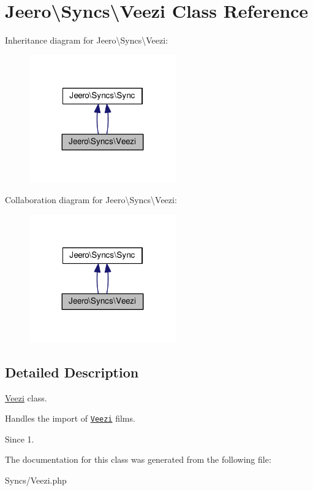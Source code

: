 \hypertarget{classJeero_1_1Syncs_1_1Veezi}{}\section{Jeero\textbackslash{}Syncs\textbackslash{}Veezi Class Reference}
\label{classJeero_1_1Syncs_1_1Veezi}


Inheritance diagram for Jeero\textbackslash{}Syncs\textbackslash{}Veezi\+:\nopagebreak
\begin{figure}[H]
\begin{center}
\leavevmode
\includegraphics[width=179pt]{classJeero_1_1Syncs_1_1Veezi__inherit__graph}
\end{center}
\end{figure}


Collaboration diagram for Jeero\textbackslash{}Syncs\textbackslash{}Veezi\+:\nopagebreak
\begin{figure}[H]
\begin{center}
\leavevmode
\includegraphics[width=179pt]{classJeero_1_1Syncs_1_1Veezi__coll__graph}
\end{center}
\end{figure}


\subsection{Detailed Description}
\hyperlink{classJeero_1_1Syncs_1_1Veezi}{Veezi} class.

Handles the import of \href{https://www.veezi.com/}{\tt Veezi} films.

\begin{DoxySince}{Since}
1. 
\end{DoxySince}


The documentation for this class was generated from the following file\+:\begin{DoxyCompactItemize}
\item 
Syncs/Veezi.\+php\end{DoxyCompactItemize}
